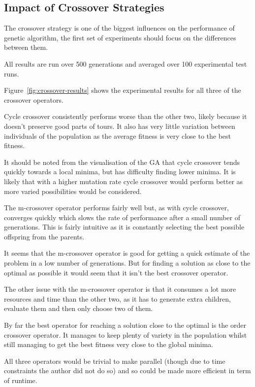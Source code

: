 \documentclass[10pt, a4paper]{article}
\begin{document}
\subsection{Impact of Crossover Strategies}
The crossover strategy is one of the biggest influences on the performance of
genetic algorithm, the first set of experiments should focus on the differences
between them.

All results are run over 500 generations and averaged over 100 experimental 
test runs.

Figure~\ref{fig:crossover-results} shows the experimental results for all three
of the crossover operators.

Cycle crossover consistently performs worse than the other two, likely because
it doesn't preserve good parts of tours. It also has very little variation
between individuals of the population as the average fitness is very close to
the best fitness.

It should be noted from the visualisation of the GA that cycle crossover tends
quickly towards a local minima, but has difficulty finding lower minima. It is
likely that with a higher mutation rate cycle crossover would perform better as
more varied possibilities would be considered.

The m-crossover operator performs fairly well but, as with cycle crossover,
converges quickly which slows the rate of performance after a small number of
generations. This is fairly intuitive as it is constantly selecting the best
possible offspring from the parents.

It seems that the m-crossover operator is good for getting a quick estimate of
the problem in a low number of generations. But for finding a solution as close
to the optimal as possible it would seem that it isn't the best crossover
operator.

The other issue with the m-crossover operator is that it consumes a lot more
resources and time than the other two, as it has to generate extra children,
evaluate them and then only choose two of them.

By far the best operator for reaching a solution close to the optimal is the
order crossover operator. It manages to keep plenty of variety in the 
population whilst still managing to get the best fitness very close to the
global minima.

All three operators would be trivial to make parallel (though due to time
constraints the author did not do so) and so could be made more efficient in
term of runtime.
\end{document}
